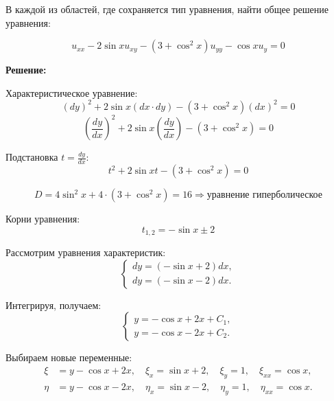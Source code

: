 \documentclass[a4paper,12pt]{article}
\begin{document}
В каждой из областей, где сохраняется тип уравнения, найти общее решение уравнения:

\begin{equation*}
    u_{xx} - 2\sin{x} u_{xy} - (3 + \cos^2{x})u_{yy} - \cos{x} u_{y} = 0
\end{equation*}

\textbf{Решение:}

Характеристическое уравнение:
\begin{equation*}
    (dy)^2 + 2\sin{x} (dx \cdot dy) - (3 + \cos^2{x}) (dx)^2 = 0
\end{equation*}
\begin{equation*}
   \left( \frac{dy}{dx} \right)^2 + 2\sin{x} \left( \frac{dy}{dx} \right)- (3 + \cos^2{x}) = 0
\end{equation*}

Подстановка $t = \frac{dy}{dx}$:
\begin{equation*}
    t^2 + 2\sin{x} t - (3 + \cos^2{x}) = 0
\end{equation*}

\begin{equation*}
    D = 4\sin^2{x} + 4\cdot(3 + \cos^2{x}) = 16 \Rightarrow \text{уравнение гиперболическое}
\end{equation*}

Корни уравнения:
\begin{equation*}
    t_{1,2} = -\sin{x} \pm 2
\end{equation*}

Рассмотрим уравнения характеристик:
\[
\begin{cases}
    dy = (-\sin{x} + 2)dx, \\
    dy = (-\sin{x} - 2)dx.
\end{cases}
\]

Интегрируя, получаем:
\[
\begin{cases}
    y = -\cos{x} + 2x + C_1, \\
    y = -\cos{x} - 2x + C_2.
\end{cases}
\]

Выбираем новые переменные:
\begin{align*}
   \xi &= y - \cos{x} + 2x, \quad \xi_x = \sin{x} + 2, \quad \xi_y = 1, \quad \xi_{xx} = \cos{x}, \\
   \eta &= y - \cos{x} - 2x, \quad \eta_x = \sin{x} - 2, \quad \eta_y = 1,  \quad \eta_{xx} = \cos{x}.
\end{align*}
\end{document}
